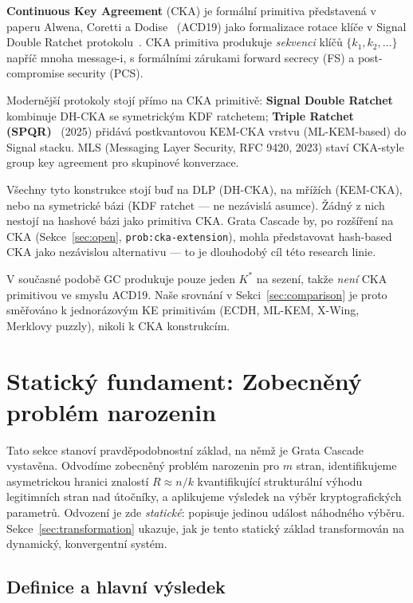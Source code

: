 \documentclass[11pt,a4paper]{article}
\begin{document}
\textbf{Continuous Key Agreement} (CKA) je formální primitiva představená v paperu Alwena, Coretti a Dodise~\cite{ACD19} (ACD19) jako formalizace rotace klíče v Signal Double Ratchet protokolu~\cite{DR2017}. CKA primitiva produkuje \emph{sekvenci} klíčů $\{k_1, k_2, \ldots\}$ napříč mnoha message-i, s formálními zárukami forward secrecy (FS) a post-compromise security (PCS).

Modernější protokoly stojí přímo na CKA primitivě: \textbf{Signal Double Ratchet}~\cite{DR2017} kombinuje DH-CKA se symetrickým KDF ratchetem; \textbf{Triple Ratchet (SPQR)}~\cite{SPQR2025} (2025) přidává postkvantovou KEM-CKA vrstvu (ML-KEM-based) do Signal stacku. MLS (Messaging Layer Security, RFC 9420, 2023) staví CKA-style group key agreement pro skupinové konverzace.

Všechny tyto konstrukce stojí buď na DLP (DH-CKA), na mřížích (KEM-CKA), nebo na symetrické bázi (KDF ratchet --- ne nezávislá asumce). Žádný z nich nestojí na hashové bázi jako primitiva CKA. Grata Cascade by, po rozšíření na CKA (Sekce~\ref{sec:open}, \texttt{prob:cka-extension}), mohla představovat hash-based CKA jako nezávislou alternativu --- to je dlouhodobý cíl této research linie.

V současné podobě GC produkuje pouze jeden $K^*$ na sezení, takže \emph{není} CKA primitivou ve smyslu ACD19. Naše srovnání v Sekci~\ref{sec:comparison} je proto směřováno k jednorázovým KE primitivám (ECDH, ML-KEM, X-Wing, Merklovy puzzly), nikoli k CKA konstrukcím.

\section{Statický fundament: Zobecněný problém narozenin}\label{sec:static}

Tato sekce stanoví pravděpodobnostní základ, na němž je Grata Cascade vystavěna. Odvodíme zobecněný problém narozenin pro $m$ stran, identifikujeme asymetrickou hranici znalostí $R \approx n/k$ kvantifikující strukturální výhodu legitimních stran nad útočníky, a aplikujeme výsledek na výběr kryptografických parametrů. Odvození je zde \emph{statické}: popisuje jedinou událost náhodného výběru. Sekce~\ref{sec:transformation} ukazuje, jak je tento statický základ transformován na dynamický, konvergentní systém.

\subsection{Definice a hlavní výsledek}
\end{document}
